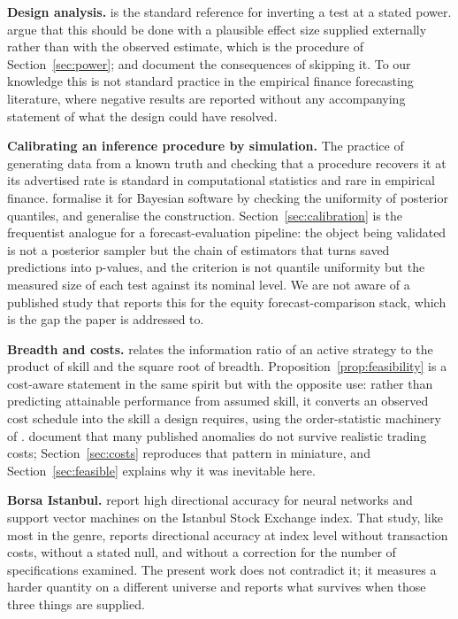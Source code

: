 \documentclass{article}
\theoremstyle{plain}
\theoremstyle{remark}
\begin{document}
\textbf{Design analysis.} \citet{cohen1988} is the standard reference for
inverting a test at a stated power. \citet{gelman2014} argue that this should be
done with a plausible effect size supplied externally rather than with the
observed estimate, which is the procedure of Section~\ref{sec:power};
\citet{button2013} and \citet{ioannidis2005} document the consequences of
skipping it. To our knowledge this is not standard practice in the empirical
finance forecasting literature, where negative results are reported without any
accompanying statement of what the design could have resolved.

\textbf{Calibrating an inference procedure by simulation.} The practice of
generating data from a known truth and checking that a procedure recovers it at
its advertised rate is standard in computational statistics and rare in
empirical finance. \citet{cook2006} formalise it for Bayesian software by
checking the uniformity of posterior quantiles, and \citet{talts2018} generalise
the construction. Section~\ref{sec:calibration} is the frequentist analogue for
a forecast-evaluation pipeline: the object being validated is not a posterior
sampler but the chain of estimators that turns saved predictions into p-values,
and the criterion is not quantile uniformity but the measured size of each test
against its nominal level. We are not aware of a published study that reports
this for the equity forecast-comparison stack, which is the gap the paper is
addressed to.

\textbf{Breadth and costs.} \citet{grinold1989} relates the information ratio of
an active strategy to the product of skill and the square root of breadth.
Proposition~\ref{prop:feasibility} is a cost-aware statement in the same spirit
but with the opposite use: rather than predicting attainable performance from
assumed skill, it converts an observed cost schedule into the skill a design
requires, using the order-statistic machinery of \citet{david2003}.
\citet{novymarx2016} document that many published anomalies do not survive
realistic trading costs; Section~\ref{sec:costs} reproduces that pattern in
miniature, and Section~\ref{sec:feasible} explains why it was inevitable here.

\textbf{Borsa Istanbul.} \citet{kara2011} report high directional accuracy for
neural networks and support vector machines on the Istanbul Stock Exchange
index. That study, like most in the genre, reports directional accuracy at index
level without transaction costs, without a stated null, and without a correction
for the number of specifications examined. The present work does not contradict
it; it measures a harder quantity on a different universe and reports what
survives when those three things are supplied.
\end{document}
